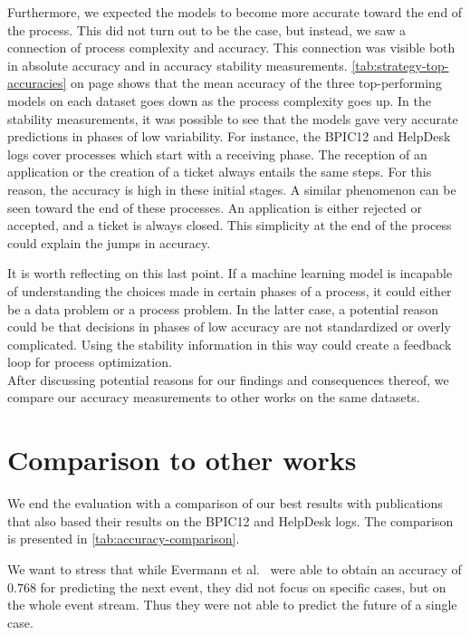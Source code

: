 Furthermore, we expected the models to become more accurate toward the end of the process.
This did not turn out to be the case, but instead, we saw a connection of process complexity and accuracy.
This connection was visible both in absolute accuracy and in accuracy stability measurements.
\autoref{tab:strategy-top-accuracies} on page \pageref{tab:strategy-top-accuracies} shows that the mean accuracy of the three top-performing models on each dataset goes down as the process complexity goes up.
In the stability measurements, it was possible to see that the models gave very accurate predictions in phases of low variability.
For instance, the BPIC12 and HelpDesk logs cover processes which start with a receiving phase.
The reception of an application or the creation of a ticket always entails the same steps.
For this reason, the accuracy is high in these initial stages.
A similar phenomenon can be seen toward the end of these processes.
An application is either rejected or accepted, and a ticket is always closed.
This simplicity at the end of the process could explain the jumps in accuracy.

It is worth reflecting on this last point.
If a machine learning model is incapable of understanding the choices made in certain phases of a process, it could either be a data problem or a process problem.
In the latter case, a potential reason could be that decisions in phases of low accuracy are not standardized or overly complicated.
Using the stability information in this way could create a feedback loop for process optimization.\\

After discussing potential reasons for our findings and consequences thereof, we compare our accuracy measurements to other works on the same datasets.

\section{Comparison to other works}
We end the evaluation with a comparison of our best results with publications that also based their results on the BPIC12 and HelpDesk logs.
The comparison is presented in \autoref{tab:accuracy-comparison}.

We want to stress that while Evermann et al.~\cite{evermann2016} were able to obtain an accuracy of $0.768$ for predicting the next event, they did not focus on specific cases, but on the whole event stream.
Thus they were not able to predict the future of a single case.

